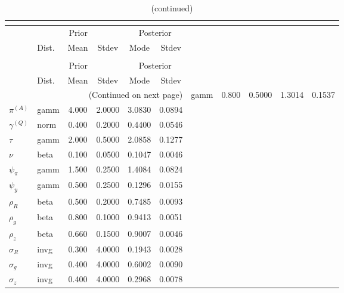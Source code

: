  
\begin{center}
\begin{longtable}{llcccc} 
\caption{Results from posterior maximization (parameters)}\\
 \label{Table:Posterior:1}\\
\toprule 
  & \multicolumn{3}{c}{Prior}  &  \multicolumn{2}{c}{Posterior} \\
  \cmidrule(r{.75em}){2-4} \cmidrule(r{.75em}){5-6}
  & Dist. & Mean  & Stdev & Mode & Stdev \\ 
\midrule \endfirsthead 
\caption{(continued)}\\
 \bottomrule 
  & \multicolumn{3}{c}{Prior}  &  \multicolumn{2}{c}{Posterior} \\
  \cmidrule(r{.75em}){2-4} \cmidrule(r{.75em}){5-6}
  & Dist. & Mean  & Stdev & Mode & Stdev \\ 
\midrule \endhead 
\bottomrule \multicolumn{6}{r}{(Continued on next page)}\endfoot 
\bottomrule\endlastfoot 
${r_{A}}$ & gamm &   0.800 & 0.5000 &   1.3014 &  0.1537 \\ 
${\pi^{(A)}}$ & gamm &   4.000 & 2.0000 &   3.0830 &  0.0894 \\ 
${\gamma^{(Q)}}$ & norm &   0.400 & 0.2000 &   0.4400 &  0.0546 \\ 
${\tau}$ & gamm &   2.000 & 0.5000 &   2.0858 &  0.1277 \\ 
${\nu}$ & beta &   0.100 & 0.0500 &   0.1047 &  0.0046 \\ 
${\psi_\pi}$ & gamm &   1.500 & 0.2500 &   1.4084 &  0.0824 \\ 
${\psi_y}$ & gamm &   0.500 & 0.2500 &   0.1296 &  0.0155 \\ 
${\rho_R}$ & beta &   0.500 & 0.2000 &   0.7485 &  0.0093 \\ 
${\rho_{g}}$ & beta &   0.800 & 0.1000 &   0.9413 &  0.0051 \\ 
${\rho_z}$ & beta &   0.660 & 0.1500 &   0.9007 &  0.0046 \\ 
${\sigma_R}$ & invg &   0.300 & 4.0000 &   0.1943 &  0.0028 \\ 
${\sigma_{g}}$ & invg &   0.400 & 4.0000 &   0.6002 &  0.0090 \\ 
${\sigma_z}$ & invg &   0.400 & 4.0000 &   0.2968 &  0.0078 \\ 
\end{longtable}
 \end{center}
